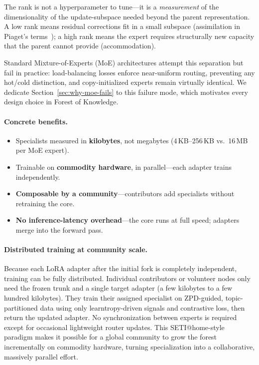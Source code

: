 \documentclass{article}
\newcommand{\tok}{Forest of Knowledge}
\begin{document}
The rank is not a hyperparameter to tune---it is a \emph{measurement} of the
dimensionality of the update-subspace needed beyond the parent representation.
A low rank means residual corrections fit in a small subspace (assimilation in
Piaget's terms~\cite{piaget1952}); a high rank means the expert requires
structurally new capacity that the parent cannot provide (accommodation).



Standard Mixture-of-Experts (MoE) architectures attempt this separation but
fail in practice: load-balancing losses enforce near-uniform routing, preventing
any hot/cold distinction, and copy-initialized experts remain virtually
identical. We dedicate Section~\ref{sec:why-moe-fails} to this failure mode,
which motivates every design choice in \tok{}.

\paragraph{Concrete benefits.}
\begin{itemize}
    \item Specialists measured in \textbf{kilobytes}, not megabytes (4\,KB--256\,KB vs.\ 16\,MB per MoE expert).
    \item Trainable on \textbf{commodity hardware}, in parallel---each adapter trains independently.
    \item \textbf{Composable by a community}---contributors add specialists without retraining the core.
    \item \textbf{No inference-latency overhead}---the core runs at full speed; adapters merge into the forward pass.
\end{itemize}

\paragraph{Distributed training at community scale.}
Because each LoRA adapter after the initial fork is completely independent,
training can be fully distributed. Individual contributors or volunteer
nodes only need the frozen trunk and a single target adapter (a few
kilobytes to a few hundred kilobytes). They train their assigned specialist
on ZPD-guided, topic-partitioned data using only learntropy-driven signals
and contrastive loss, then return the updated adapter. No synchronization
between experts is required except for occasional lightweight router
updates. This SETI@home-style paradigm makes it possible for a global
community to grow the forest incrementally on commodity hardware, turning
specialization into a collaborative, massively parallel effort.
\end{document}
